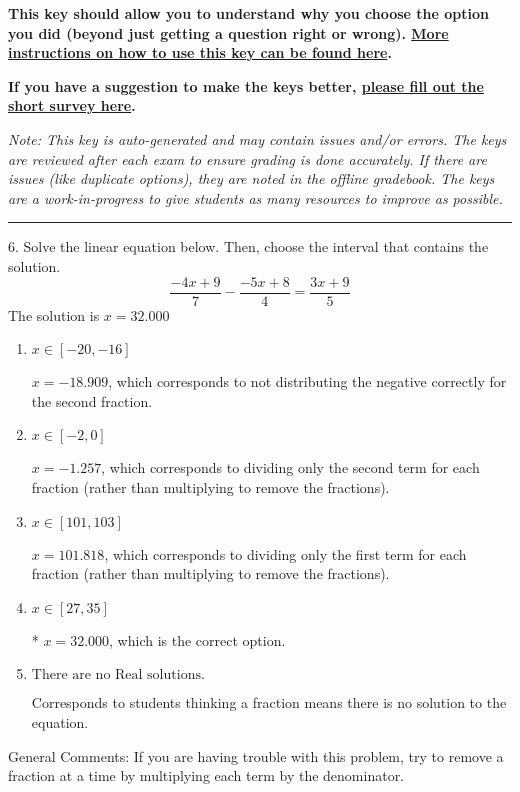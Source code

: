 \documentclass{extbook}[14pt]
\begin{document}
\textbf{This key should allow you to understand why you choose the option you did (beyond just getting a question right or wrong). \href{https://xronos.clas.ufl.edu/mac1105spring2020/courseDescriptionAndMisc/Exams/LearningFromResults}{More instructions on how to use this key can be found here}.}

\textbf{If you have a suggestion to make the keys better, \href{https://forms.gle/CZkbZmPbC9XALEE88}{please fill out the short survey here}.}

\textit{Note: This key is auto-generated and may contain issues and/or errors. The keys are reviewed after each exam to ensure grading is done accurately. If there are issues (like duplicate options), they are noted in the offline gradebook. The keys are a work-in-progress to give students as many resources to improve as possible.}

\rule{\textwidth}{0.4pt}

6. Solve the linear equation below. Then, choose the interval that contains the solution.
\[ \frac{-4 x + 9}{7} - \frac{-5 x + 8}{4} = \frac{3 x + 9}{5} \] 
The solution is $ x = 32.000 $ 

\begin{enumerate}[label=\Alph*.] 
\item $ x \in [-20, -16] $ 

  $x = -18.909$, which corresponds to not distributing the negative correctly for the second fraction. 
\item $ x \in [-2, 0] $ 

  $x = -1.257$, which corresponds to dividing only the second term for each fraction (rather than multiplying to remove the fractions). 
\item $ x \in [101, 103] $ 

  $x = 101.818$, which corresponds to dividing only the first term for each fraction (rather than multiplying to remove the fractions). 
\item $ x \in [27, 35] $ 

 * $x = 32.000$, which is the correct option. 
\item $ \text{There are no Real solutions.} $ 

 Corresponds to students thinking a fraction means there is no solution to the equation. 
\end{enumerate} 
 
General Comments: If you are having trouble with this problem, try to remove a fraction at a time by multiplying each term by the denominator.
\end{document}
